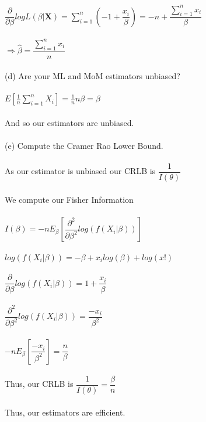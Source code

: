 \documentclass{article}
\begin{document}
$\dfrac{\partial}{\partial\beta}logL(\beta|\textbf{X})=\sum_{i=1}^n(-1+\dfrac{x_i}{\beta})=-n+\dfrac{\sum_{i=1}^nx_i}{\beta}$\\\\
$\Rightarrow \hat{\beta}=\dfrac{\sum_{i=1}^nx_i}{n}$\\\\
(d) Are your ML and MoM estimators unbiased?\\\\
$E[\frac{1}{n}\sum_{i=1}^nX_i]=\frac{1}{n}n\beta=\beta$\\\\
And so our estimators are unbiased.\\\\
(e) Compute the Cramer Rao Lower Bound.\\\\
As our estimator is unbiased our CRLB is $\dfrac{1}{I(\theta)}$\\\\
We compute our Fisher Information\\\\
$I(\beta)=-nE_\beta[\dfrac{\partial^2}{\partial\beta^2}log(f(X_i|\beta))]$\\\\
$log(f(X_i|\beta))=-\beta+x_ilog(\beta)+log(x!)$\\\\
$\dfrac{\partial}{\partial\beta}log(f(X_i|\beta))=1+\dfrac{x_i}{\beta}$\\\\
$\dfrac{\partial^2}{\partial\beta^2}log(f(X_i|\beta))=\dfrac{-x_i}{\beta^2}$\\\\
$-nE_\beta[\dfrac{-x_i}{\beta^2}]=\dfrac{n}{\beta}$\\\\
Thus, our CRLB is $\dfrac{1}{I(\theta)}=\dfrac{\beta}{n}$\\\\
Thus, our estimators are efficient.
\pagebreak
\end{document}
